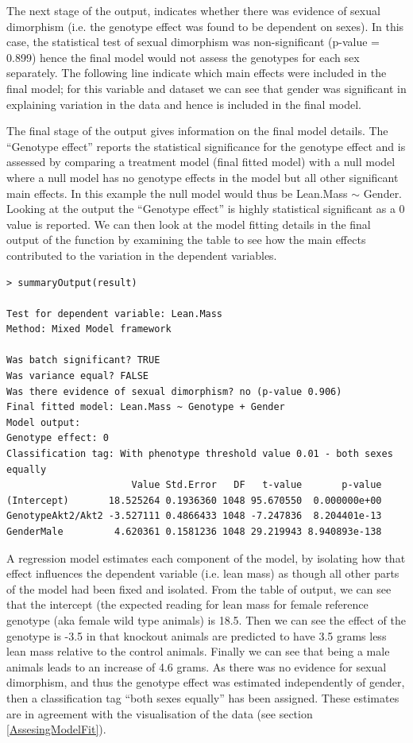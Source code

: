 \documentclass[12pt,a4paper]{article}
\begin{document}
The next stage of the output, indicates whether there was evidence of sexual dimorphism (i.e. the genotype effect was found to be dependent on sexes).  
In this case, the statistical test of sexual dimorphism was non-significant (p-value = 0.899) hence the final model would not assess the genotypes for each sex separately.  
The following line indicate which main effects were included in the final model; 
for this variable and dataset we can see that gender was significant in explaining variation in the data and hence is included in the final model. 

The final stage of the output gives information on the final model details.  
The “Genotype effect” reports the statistical significance for the genotype effect and is assessed by comparing a treatment model (final fitted model) with a null model where a null model 
has no genotype effects in the model but all other significant main effects.  
In this example the null model would thus be Lean.Mass $\sim$ Gender. Looking at the output the “Genotype effect” is highly statistical significant as a 0 value is reported.  
We can then look at the model fitting details in the final output of the function by examining the table to see how the main effects contributed to the variation in the dependent variables. 

\begingroup
    \fontsize{8pt}{12pt}\selectfont
\begin{verbatim}
> summaryOutput(result)

Test for dependent variable: Lean.Mass
Method: Mixed Model framework

Was batch significant? TRUE
Was variance equal? FALSE
Was there evidence of sexual dimorphism? no (p-value 0.906)
Final fitted model: Lean.Mass ~ Genotype + Gender
Model output:
Genotype effect: 0
Classification tag: With phenotype threshold value 0.01 - both sexes equally
                      Value Std.Error   DF   t-value       p-value
(Intercept)       18.525264 0.1936360 1048 95.670550  0.000000e+00
GenotypeAkt2/Akt2 -3.527111 0.4866433 1048 -7.247836  8.204401e-13
GenderMale         4.620361 0.1581236 1048 29.219943 8.940893e-138

\end{verbatim}
\endgroup 

A regression model estimates each component of the model, by isolating how that effect influences the dependent variable (i.e. lean mass) as though all other parts of the model had been fixed and isolated.   
From the table of output, we can see that the intercept (the expected reading for lean mass for female reference genotype (aka female wild type animals) is 18.5.  
Then we can see the effect of the genotype is -3.5 in that knockout animals are predicted to have 3.5 grams less lean mass relative to the control animals.  
Finally we can see that being a male animals leads to an increase of 4.6 grams.  
As there was no evidence for sexual dimorphism, and thus the genotype effect was estimated independently of gender, then a classification tag “both sexes equally” has been assigned.  
These estimates are in agreement with the visualisation of the data (see section \ref{AssesingModelFit}). 
\end{document}
